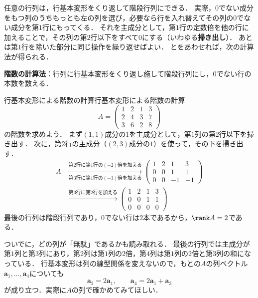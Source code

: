 任意の行列は，行基本変形をくり返して階段行列にできる．
実際，$0$でない成分をもつ列のうちもっとも左の列を選び，必要なら行を入れ替えてその列の$0$でない成分を第$1$行にもってくる．
それを主成分として，第$1$行の定数倍を他の行に加えることで，その列の第$2$行以下をすべて$0$にする（いわゆる\textbf{掃き出し}）．
あとは第$1$行を除いた部分に同じ操作を繰り返せばよい．
とをあわせれば，次の計算法が得られる．

\begin{tcolorbox}[colback=white, colframe=black, boxrule=0.5pt, arc=0pt, left=2mm, right=2mm, top=1mm, bottom=1mm]
  \textbf{階数の計算法}：行列に行基本変形をくり返し施して階段行列にし，$0$でない行の本数を数える．
\end{tcolorbox}

\begin{example}{行基本変形による階数の計算}{行基本変形による階数の計算}
  \[
    A = \begin{pmatrix}
      1 & 2 & 1 & 3 \\
      2 & 4 & 3 & 7 \\
      3 & 6 & 2 & 8
    \end{pmatrix}
  \]
  の階数を求めよう．
  まず$(1, 1)$成分の$1$を主成分として，第$1$列の第$2$行以下を掃き出す．
  次に，第$2$行の主成分（$(2, 3)$成分の$1$）を使って，その下を掃き出す．
  \begin{align*}
    A
    &\xrightarrow[\text{第$3$行に第$1$行の$(-3)$倍を加える}]{\text{第$2$行に第$1$行の$(-2)$倍を加える}}
    \begin{pmatrix}
      1 & 2 & 1 & 3 \\
      0 & 0 & 1 & 1 \\
      0 & 0 & -1 & -1
    \end{pmatrix} \\
    &\xrightarrow{\text{第$3$行に第$2$行を加える}}
    \begin{pmatrix}
      1 & 2 & 1 & 3 \\
      0 & 0 & 1 & 1 \\
      0 & 0 & 0 & 0
    \end{pmatrix}
  \end{align*}
  最後の行列は階段行列であり，$0$でない行は$2$本であるから，$\rank A = 2$である．

  ついでに，どの列が「無駄」であるかも読み取れる．
  最後の行列では主成分が第$1$列と第$3$列にあり，第$2$列は第$1$列の$2$倍，第$4$列は第$1$列の$2$倍と第$3$列の和になっている．
  行基本変形は列の線型関係を変えないので，もとの$A$の列ベクトル$\bm{a}_1, \dots, \bm{a}_4$についても
  \[
    \bm{a}_2 = 2\bm{a}_1, \qquad \bm{a}_4 = 2\bm{a}_1 + \bm{a}_3
  \]
  が成り立つ．実際に$A$の列で確かめてみてほしい．
\end{example}

